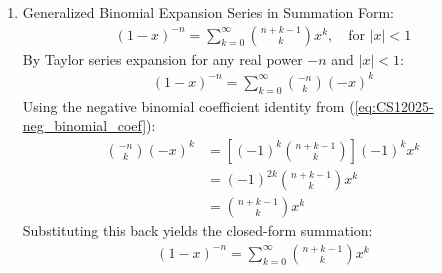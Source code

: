 \begin{enumerate}[label=\thesubsection.\arabic*, ref=\thesubsection.\theenumi, itemsep=0.5cm]
\item Generalized Binomial Expansion Series in Summation Form:
\begin{align}
(1 - x)^{-n} = \sum_{k=0}^{\infty} \binom{n+k-1}{k} x^k, \quad \text{for } |x| < 1 \label{eq:CS12025-binomial_series_sum}
\end{align}
\solution
By Taylor series expansion for any real power $-n$ and $|x| < 1$:
\begin{align}
(1 - x)^{-n} = \sum_{k=0}^{\infty} \binom{-n}{k} (-x)^k
\end{align}
Using the negative binomial coefficient identity from (\ref{eq:CS12025-neg_binomial_coef}):
\begin{align}
\binom{-n}{k} (-x)^k &= \left[ (-1)^k \binom{n+k-1}{k} \right] (-1)^k x^k \\
&= (-1)^{2k} \binom{n+k-1}{k} x^k \\
&= \binom{n+k-1}{k} x^k
\end{align}
Substituting this back yields the closed-form summation:
\begin{align}
(1 - x)^{-n} = \sum_{k=0}^{\infty} \binom{n+k-1}{k} x^k
\end{align}


\end{enumerate}
